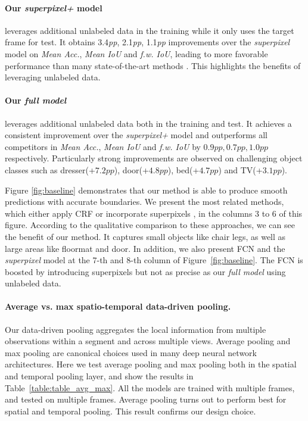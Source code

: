 \paragraph{Our \textit{superpixel+} model} leverages additional unlabeled data in the training while it only uses the target frame for test. It obtains 3.4\textit{pp}, 2.1\textit{pp}, 1.1\textit{pp} improvements over the \textit{superpixel} model on \textit{Mean Acc.}, \textit{Mean IoU} and \textit{f.w. IoU},
leading to more favorable performance than many state-of-the-art methods \cite{deng2015semantic,gupta2014learning,alex2015bayesiansegnet,david2015multiscale,crfasrnn_iccv2015,chen2014semantic,raghudeep2015spCNN,region_end2end2016eccv}.
This highlights the benefits of leveraging unlabeled data.
\paragraph{Our \textit{full model}} leverages additional unlabeled data both in the training and test. It achieves a consistent improvement over the \textit{superpixel+} model and outperforms all competitors in \textit{Mean Acc.}, \textit{Mean IoU} and \textit{f.w. IoU} by $0.9pp, 0.7pp, 1.0pp$ respectively.
Particularly strong improvements are observed on challenging object classes such as dresser(+$7.2pp$), door(+$4.8pp$), bed(+$4.7pp$) and TV(+$3.1pp$).

Figure \ref{fig:baseline} demonstrates that our method is able to produce smooth predictions with accurate boundaries.
We present the most related methods, which either apply CRF \cite{crfasrnn_iccv2015, chen2016deeplab} or incorporate superpixels \cite{raghudeep2015spCNN, region_end2end2016eccv}, in the columns 3 to 6 of this figure.
According to the qualitative comparison to these approaches, we can see the benefit of our method. It captures small objects like chair legs, as well as large areas like floormat and door.
In addition, we also present FCN and the \textit{superpixel} model at the 7-th and 8-th column of Figure~\ref{fig:baseline}. The FCN is boosted by introducing superpixels but not as precise as our \textit{full model} using unlabeled data.

\vspace{-0.3cm}
\paragraph{Average vs. max spatio-temporal data-driven pooling.}
Our data-driven pooling aggregates the local information from multiple observations within a segment and across multiple views.
Average pooling and max pooling are canonical choices used in many deep neural network architectures.
Here we test average pooling and max pooling both in the spatial and temporal pooling layer, and show the results in Table~\ref{table:table_avg_max}.
All the models are trained with multiple frames, and tested on multiple frames.
Average pooling turns out to perform best for spatial and temporal pooling. This result confirms our design choice.

